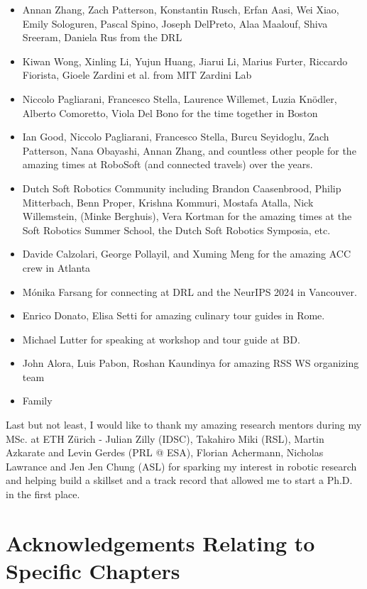 \begin{itemize}
    \item Annan Zhang, Zach Patterson, Konstantin Rusch, Erfan Aasi, Wei Xiao, Emily Sologuren, Pascal Spino, Joseph DelPreto, Alaa Maalouf, Shiva Sreeram, Daniela Rus from the DRL
    \item Kiwan Wong, Xinling Li, Yujun Huang, Jiarui Li, Marius Furter, Riccardo Fiorista, Gioele Zardini et al. from MIT Zardini Lab
    \item Niccolo Pagliarani, Francesco Stella, Laurence Willemet, Luzia Knödler, Alberto Comoretto, Viola Del Bono for the time together in Boston
    \item Ian Good, Niccolo Pagliarani, Francesco Stella, Burcu Seyidoglu, Zach Patterson, Nana Obayashi, Annan Zhang, and countless other people for the amazing times at RoboSoft (and connected travels) over the years.
    \item Dutch Soft Robotics Community including Brandon Caasenbrood, Philip Mitterbach, Benn Proper, Krishna Kommuri, Mostafa Atalla, Nick Willemstein, (Minke Berghuis), Vera Kortman for the amazing times at the Soft Robotics Summer School, the Dutch Soft Robotics Symposia, etc.
    \item Davide Calzolari, George Pollayil, and Xuming Meng for the amazing ACC crew in Atlanta
    \item Mónika Farsang for connecting at DRL and the NeurIPS 2024 in Vancouver.
    \item Enrico Donato, Elisa Setti for amazing culinary tour guides in Rome.
    \item Michael Lutter for speaking at workshop and tour guide at BD.
    \item John Alora, Luis Pabon, Roshan Kaundinya for amazing RSS WS organizing team
    \item Family
\end{itemize}

Last but not least, I would like to thank my amazing research mentors during my MSc. at ETH Zürich - Julian Zilly (IDSC), Takahiro Miki (RSL), Martin Azkarate and Levin Gerdes (PRL @ ESA),  Florian Achermann, Nicholas Lawrance and Jen Jen Chung (ASL) for sparking my interest in robotic research and helping build a skillset and a track record that allowed me to start a Ph.D. in the first place.

\section*{Acknowledgements Relating to Specific Chapters}
\vspace{0.3cm}

